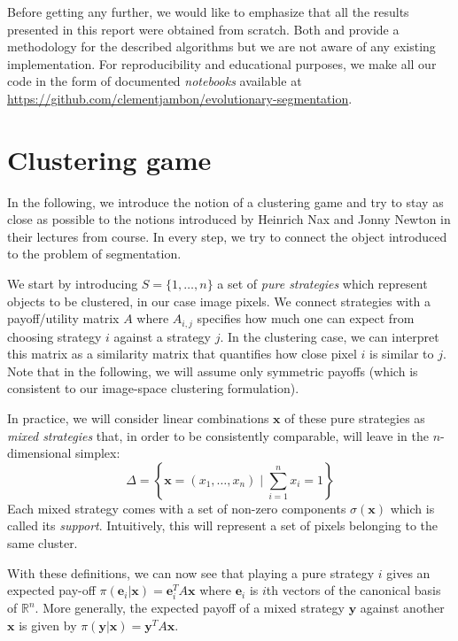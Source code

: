 \documentclass[11pt,a4paper]{article}
\begin{document}
Before getting any further, we would like to emphasize that all the results presented in this report were obtained from scratch. Both \cite{bulo-thesis} and \cite{game-clustering} provide a methodology for the described algorithms but we are not aware of any existing implementation. For reproducibility and educational purposes, we make all our code in the form of documented \textit{notebooks} available at \url{https://github.com/clementjambon/evolutionary-segmentation}. 

\section{Clustering game}
\label{sec:cluster-game}

In the following, we introduce the notion of a clustering game and try to stay as close as possible to the notions introduced by Heinrich Nax and Jonny Newton in their lectures from course\cite{course-gt}. In every step, we try to connect the object introduced to the problem of segmentation.

We start by introducing $S=\{1, \ldots, n\}$ a set of \textit{pure strategies} which represent objects to be clustered, in our case image pixels. We connect strategies with a payoff/utility matrix $A$ where $A_{i, j}$ specifies how much one can expect from choosing strategy $i$ against a strategy $j$. In the clustering case, we can interpret this matrix as a similarity matrix that quantifies how close pixel $i$ is similar to $j$. Note that in the following, we will assume only symmetric payoffs (which is consistent to our image-space clustering formulation). 

In practice, we will consider linear combinations $\mathbf{x}$ of these pure strategies as \textit{mixed strategies} that, in order to be consistently comparable, will leave in the $n$-dimensional simplex:
\begin{equation}
    \Delta = \left\{\mathbf{x} = (x_1, \ldots, x_n)\; |\; \sum_{i=1}^n x_i = 1\right\}
\end{equation}
Each mixed strategy comes with a set of non-zero components $\sigma(\mathbf{x})$ which is called its \textit{support}. Intuitively, this will represent a set of pixels belonging to the same cluster. 

With these definitions, we can now see that playing a pure strategy $i$ gives an expected pay-off $\pi(\mathbf{e}_i|\mathbf{x})=\mathbf{e}_i^TA\mathbf{x}$ where $\mathbf{e}_i$ is $i$th vectors of the canonical basis of $\mathbb{R}^n$. More generally, the expected payoff of a mixed strategy $\mathbf{y}$ against another $\mathbf{x}$ is given by $\pi(\mathbf{y}|\mathbf{x})=\mathbf{y}^TA\mathbf{x}$.
\end{document}

